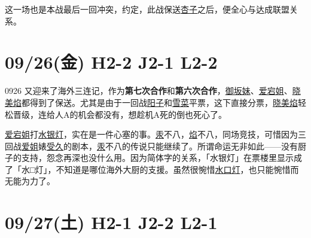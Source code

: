 这一场也是本战最后一回冲突，约定，此战保送\uline{杏子}之后，便全心与达成联盟关系。

\section{09/26(金) H2-2 J2-1 L2-2}


0926 又迎来了海外三连记，作为\textbf{第七次合作}和\textbf{第六次合作}，\uline{御坂妹}、\uline{爱宕姐}、\uline{晓美焰}都得到了保送。尤其是由于一回战\uline{阳子}和\uline{雪菜}平票，这下直接分票，\uline{晓美焰}轻松晋级，连给人A的机会都没有，想趁机A死的倒也死心了。

\uline{爱宕姐}打\uline{水银灯}，实在是一件心塞的事。\uline{汞}不八，\uline{焰}不八，同场竞技，可惜因为三回战\uline{爱姐}婊\uline{受久}的剧本，\uline{汞}不八的传说只能继续了。所谓命运无非如此——没有厨子的支持，怨念再深也没什么用。因为简体字的关系，「水银灯」在票楼里显示成了「{\mincho 水$\!\!$□$\!\!$灯}」，不知道是哪位海外大厨的支援。虽然很惋惜\uline{水口灯}，也只能惋惜而无能为力了。

\section{09/27(土) H2-1 J2-2 L2-1}


